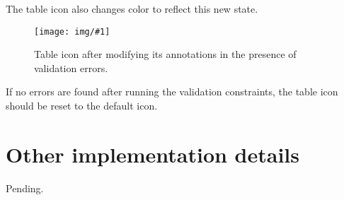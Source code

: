 \documentclass[a4paper, 10pt]{article}
\newcommand{\img}[3]{
  \begin{figure}[H]
    \begin{center}
      \texttt{[image: img/\#1]}
      \caption{#2}
    \end{center}
  \end{figure}
}
\begin{document}
The table icon also changes color to reflect this new state.

\img{table-pin-after-modifications.png}{
  Table icon after modifying its annotations in the presence of validation
  errors.
}{5cm}

If no errors are found after running the validation constraints, the table icon
should be reset to the default icon.


\section{Other implementation details}

Pending. %
\end{document}
